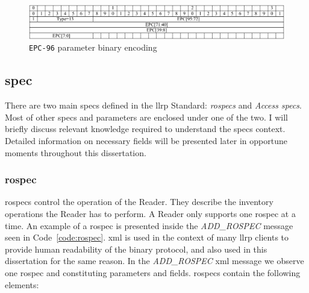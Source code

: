 \begin{figure}[]
    \centering
    \includegraphics[width=\textwidth]{./figs/02-state-of-the-art/EPC96ParameterTVEncoding_bin.pdf}
    \caption[\texttt{EPC-96} parameter binary encoding]{\texttt{EPC-96} parameter binary encoding~\cite{LowLevelReader}}
    \label{fig:EPC96bin}
\end{figure}

\subsection{\acf{spec}} \label{sec:llrpspecs}

There are two main \acp{spec} defined in the \ac{llrp} Standard:  \textit{\acp{rospec}} and \textit{Access \acp{spec}}. Most of other \acp{spec} and parameters are enclosed under one of the two.
I will briefly discuss relevant knowledge required to understand the \acp{spec} context. Detailed information on necessary fields will be presented later in opportune moments throughout this dissertation.

\subsubsection{\acf{rospec}}

\acp{rospec} control the operation of the Reader. They describe the inventory operations the Reader has to perform.
A Reader only supports one \ac{rospec} at a time.
An example of a \ac{rospec} is presented inside the \textit{ADD\_ROSPEC} message seen in Code~\ref{code:rospec}. \ac{xml} is used in the context of many \ac{llrp} clients to provide human readability of the binary protocol, and also used in this dissertation for the same reason.
In the \textit{ADD\_ROSPEC} \ac{xml} message we observe one \ac{rospec} and constituting parameters and fields.
\acp{rospec} contain the following elements:

